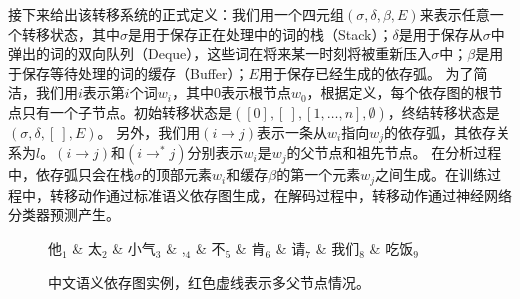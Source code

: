 接下来给出该转移系统的正式定义：我们用一个四元组$(\sigma,\delta,\beta,E)$来表示任意一个转移状态，其中$\sigma$是用于保存正在处理中的词的栈（Stack）；$\delta$是用于保存从$\sigma$中弹出的词的双向队列（Deque），这些词在将来某一时刻将被重新压入$\sigma$中；$\beta$是用于保存等待处理的词的缓存（Buffer）；$E$用于保存已经生成的依存弧。
为了简洁，我们用$i$表示第$i$个词$w_i$，其中$0$表示根节点$w_0$，根据定义，每个依存图的根节点只有一个子节点。初始转移状态是$([0],[\ ],[1,\dots,n],\emptyset)$，终结转移状态是$(\sigma,\delta,[\ ],E)$。
另外，我们用$(i\rightarrow j)$表示一条从$w_i$指向$w_j$的依存弧，其依存关系为$l$。$(i\rightarrow j)$和$(i\rightarrow^*j)$分别表示$w_i$是$w_j$的父节点和祖先节点。
在分析过程中，依存弧只会在栈$\sigma$的顶部元素$w_i$和缓存$\beta$的第一个元素$w_j$之间生成。在训练过程中，转移动作通过标准语义依存图生成，在解码过程中，转移动作通过神经网络分类器预测产生。

\begin{figure}[tb]
	\centering
	\begin{dependency}[theme = simple,label style={font=\bfseries,thick}]
		\begin{deptext}[column sep=0.5em]
			他$_1$ \& 太$_2$ \& 小气$_3$ \& ,$_4$ \& 不$_5$ \& 肯$_6$ \& 请$_7$ \& 我们$_8$ \& 吃饭$_9$ \\
		\end{deptext}
	\end{dependency}
	\caption{中文语义依存图实例，红色虚线表示多父节点情况。}
	\label{fig:csdg0}
\end{figure}


